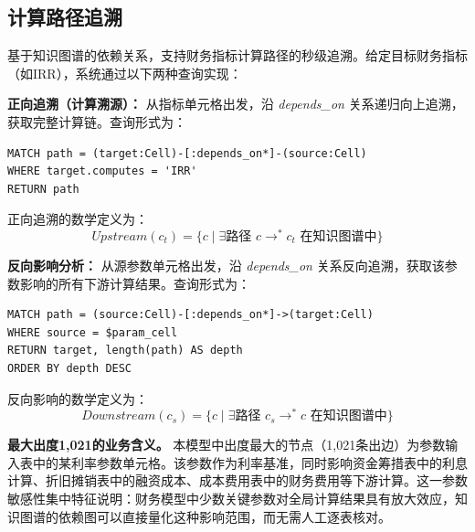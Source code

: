 \subsection{\heiti 计算路径追溯}

基于知识图谱的依赖关系，支持财务指标计算路径的秒级追溯。给定目标财务指标（如IRR），系统通过以下两种查询实现：

\textbf{正向追溯（计算溯源）：} 从指标单元格出发，沿 \textit{depends\_on} 关系递归向上追溯，获取完整计算链。查询形式为：
\begin{verbatim}
MATCH path = (target:Cell)-[:depends_on*]-(source:Cell)
WHERE target.computes = 'IRR'
RETURN path
\end{verbatim}
正向追溯的数学定义为：
$$\mathit{Upstream}(c_t) = \{c \mid \exists \text{路径 } c \to^* c_t \text{ 在知识图谱中}\}$$

\textbf{反向影响分析：} 从源参数单元格出发，沿 \textit{depends\_on} 关系反向追溯，获取该参数影响的所有下游计算结果。查询形式为：
\begin{verbatim}
MATCH path = (source:Cell)-[:depends_on*]->(target:Cell)
WHERE source = $param_cell
RETURN target, length(path) AS depth
ORDER BY depth DESC
\end{verbatim}
反向影响的数学定义为：
$$\mathit{Downstream}(c_s) = \{c \mid \exists \text{路径 } c_s \to^* c \text{ 在知识图谱中}\}$$

\textbf{最大出度1,021的业务含义。} 本模型中出度最大的节点（1,021条出边）为参数输入表中的某利率参数单元格。该参数作为利率基准，同时影响资金筹措表中的利息计算、折旧摊销表中的融资成本、成本费用表中的财务费用等下游计算。这一参数敏感性集中特征说明：财务模型中少数关键参数对全局计算结果具有放大效应，知识图谱的依赖图可以直接量化这种影响范围，而无需人工逐表核对。
